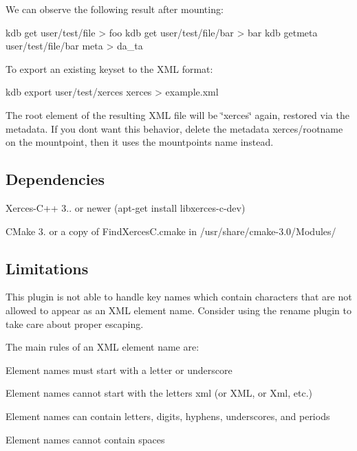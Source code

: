 We can observe the following result after mounting\+: \begin{DoxyVerb}    kdb get user/test/file > foo
    kdb get user/test/file/bar > bar
    kdb getmeta user/test/file/bar meta > da_ta
\end{DoxyVerb}


To export an existing keyset to the X\+ML format\+: \begin{DoxyVerb}    kdb export user/test/xerces xerces > example.xml
\end{DoxyVerb}


The root element of the resulting X\+ML file will be \char`\"{}xerces\char`\"{} again, restored via the metadata. If you don\textquotesingle{}t want this behavior, delete the metadata {\ttfamily xerces/rootname} on the mountpoint, then it uses the mountpoint\textquotesingle{}s name instead.

\subsection*{Dependencies}


\begin{DoxyItemize}
\item {\ttfamily Xerces-\/\+C++ 3..} or newer ({\ttfamily apt-\/get install libxerces-\/c-\/dev})
\item C\+Make 3. or a copy of {\ttfamily Find\+Xerces\+C.\+cmake} in {\ttfamily /usr/share/cmake-\/3.0/\+Modules/}
\end{DoxyItemize}

\subsection*{Limitations}

This plugin is not able to handle key names which contain characters that are not allowed to appear as an X\+ML element name. Consider using the rename plugin to take care about proper escaping.

The main rules of an X\+ML element name are\+:
\begin{DoxyItemize}
\item Element names must start with a letter or underscore
\item Element names cannot start with the letters xml (or X\+ML, or Xml, etc.)
\item Element names can contain letters, digits, hyphens, underscores, and periods
\item Element names cannot contain spaces
\end{DoxyItemize}

